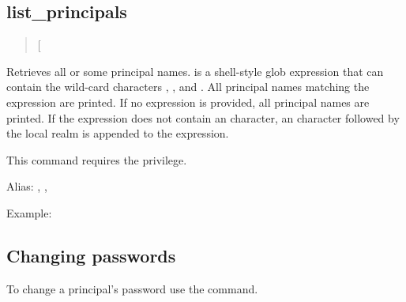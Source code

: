\documentclass[letterpaper,10pt,english]{sphinxmanual}
\begin{document}
\subsection{list\_principals}
\label{\detokenize{admin/database:list-principals}}\begin{quote}

 {[}\sphinxstyleemphasis{expression}{]}
\end{quote}

Retrieves all or some principal names.   is a shell-style
glob expression that can contain the wild-card characters ,
\sphinxcode{*}, and \sphinxcode{{[}{]}}.  All principal names matching the expression are
printed.  If no expression is provided, all principal names are
printed.  If the expression does not contain an  character, an
 character followed by the local realm is appended to the
expression.

This command requires the  privilege.

Alias: , , 

Example:

%
\begin{sphinxVerbatim}[commandchars=\\\{\}]
   
\end{sphinxVerbatim}


\subsection{Changing passwords}
\label{\detokenize{admin/database:changing-passwords}}
To change a principal’s password use the {\hyperref[\detokenize{admin/admin_commands/kadmin_local:kadmin-1}]{}}
 command.
\end{document}
